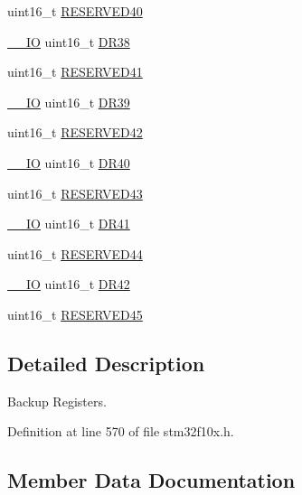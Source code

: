 \begin{DoxyCompactItemize}
\item 
uint16\+\_\+t \hyperlink{struct_b_k_p___type_def_ad2a0438e85f576fb2f86d6451f1801b3}{R\+E\+S\+E\+R\+V\+E\+D40}
\item 
\hyperlink{core__sc300_8h_aec43007d9998a0a0e01faede4133d6be}{\+\_\+\+\_\+\+IO} uint16\+\_\+t \hyperlink{struct_b_k_p___type_def_accfaf41ee048545b7c9c0ed069165c6e}{D\+R38}
\item 
uint16\+\_\+t \hyperlink{struct_b_k_p___type_def_acc7168a69e4540fe45541c9bcb013cd5}{R\+E\+S\+E\+R\+V\+E\+D41}
\item 
\hyperlink{core__sc300_8h_aec43007d9998a0a0e01faede4133d6be}{\+\_\+\+\_\+\+IO} uint16\+\_\+t \hyperlink{struct_b_k_p___type_def_a599452e0f9d6e1e1fa75730aec9228fd}{D\+R39}
\item 
uint16\+\_\+t \hyperlink{struct_b_k_p___type_def_a6c6fdbc4e9c4da805e346636cc2ef0c2}{R\+E\+S\+E\+R\+V\+E\+D42}
\item 
\hyperlink{core__sc300_8h_aec43007d9998a0a0e01faede4133d6be}{\+\_\+\+\_\+\+IO} uint16\+\_\+t \hyperlink{struct_b_k_p___type_def_a1811cf03bde48bc9becc8795d3e09d7f}{D\+R40}
\item 
uint16\+\_\+t \hyperlink{struct_b_k_p___type_def_ab83c42a1464c23dc1ed953a7eb5dc42a}{R\+E\+S\+E\+R\+V\+E\+D43}
\item 
\hyperlink{core__sc300_8h_aec43007d9998a0a0e01faede4133d6be}{\+\_\+\+\_\+\+IO} uint16\+\_\+t \hyperlink{struct_b_k_p___type_def_a9e9b72b388e2ed718df333cfb9e90226}{D\+R41}
\item 
uint16\+\_\+t \hyperlink{struct_b_k_p___type_def_ace6f58bc4fe4083665e1512dfc6018c2}{R\+E\+S\+E\+R\+V\+E\+D44}
\item 
\hyperlink{core__sc300_8h_aec43007d9998a0a0e01faede4133d6be}{\+\_\+\+\_\+\+IO} uint16\+\_\+t \hyperlink{struct_b_k_p___type_def_af7a01e3a3e1be76ebb8100e7ff6de9c0}{D\+R42}
\item 
uint16\+\_\+t \hyperlink{struct_b_k_p___type_def_affa0a45a3aaa83ef2949761b44ad4283}{R\+E\+S\+E\+R\+V\+E\+D45}
\end{DoxyCompactItemize}


\subsection{Detailed Description}
Backup Registers. 

Definition at line 570 of file stm32f10x.\+h.



\subsection{Member Data Documentation}
\mbox{\label{struct_b_k_p___type_def_adbf9c928b534b4a017429de248982284}} 
